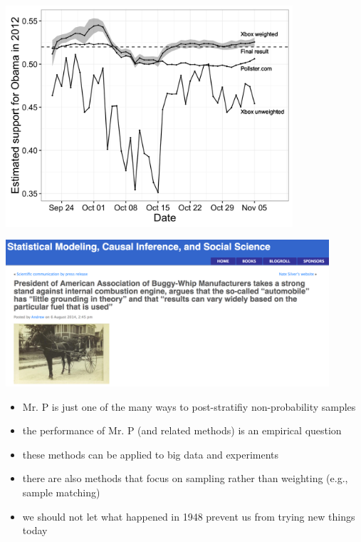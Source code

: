 \documentclass[aspectratio=169]{beamer}
\def\vf{\vfill}
\begin{document}
\begin{frame}

\begin{center}
\includegraphics[width=0.8\textwidth]{figures/wang_forecasting_2015_fig2_and_3}
\end{center}

\end{frame}
\begin{frame}

\begin{center}
\includegraphics[width=0.9\textwidth]{figures/gelman_buggywhip_blogpost}
\end{center}

\vf
{}

\end{frame}
\begin{frame}

\begin{itemize}
\item Mr. P is just one of the many ways to post-stratifiy non-probability samples
\pause
\item the performance of Mr. P (and related methods) is an empirical question
\pause
\item these methods can be applied to big data and experiments
\pause
\item there are also methods that focus on sampling rather than weighting (e.g., sample matching)
\pause
\item we should not let what happened in 1948 prevent us from trying new things today
\end{itemize}

\end{frame}
\end{document}
